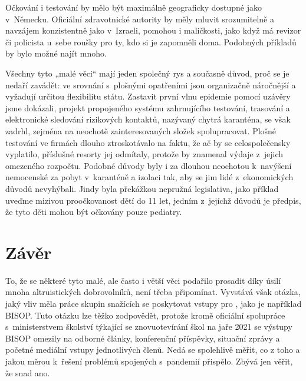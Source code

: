 Očkování i testování by mělo být maximálně geograficky dostupné jako v~Ně\-mec\-ku. Oficiální zdravotnické autority by měly mluvit srozumitelně a navzájem konzistentně jako v~Izraeli, pomohou i maličkosti, jako když má revizor či policista u~sebe roušky pro ty, kdo si je zapomněli doma. Podobných příkladů by bylo možné najít mnoho.

Všechny tyto „malé věci“ mají jeden společný rys a současně důvod, proč se je nedaří zavádět: ve srovnání s~plošnými opatřeními jsou organizačně náročnější a vyžadují určitou flexibilitu státu. Zastavit první vlnu epidemie pomocí uzávěry jsme dokázali, projekt propojeného systému zahrnujícího testování, trasování a elektronické sledování rizikových kontaktů, nazývaný chytrá karanténa, se však zadrhl, zejména na neochotě zainteresovaných složek spolupracovat. Plošné testování ve firmách dlouho ztroskotávalo na faktu, že ač by se celospolečensky vyplatilo, příslušné resorty jej odmítaly, protože by znamenal výdaje z~jejich omezeného roz\-poč\-tu. Podobné důvody byly i za dlouhou neochotou k~navýšení nemocenské za pobyt v~karanténě a izolaci tak, aby se jim lidé z~ekonomických důvodů nevyhýbali. Jindy byla překážkou nepružná legislativa, jako příklad uveďme mizivou proočkovanost dětí do 11 let, jedním z~jejíchž důvodů je předpis, že tyto děti mohou být očkovány pouze pediatry. 

\section*{Závěr}

To, že se některé tyto malé, ale často i větší věci podařilo prosadit díky úsilí mnoha altruistických dobrovolníků, není třeba připomínat. Vyvstává však otázka, jaký vliv měla práce skupin snažících se poskytovat vstupy pro , jako je například BISOP.  Tuto otázku lze těžko zodpovědět, protože kromě oficiální spolupráce s~ministerstvem školství týkající se znovuotevírání škol na jaře 2021 se výstupy BISOP omezily na odborné články, konferenční příspěvky, situační zprávy a početné mediální vstupy jednotlivých členů. Nedá se spolehlivě měřit, co z toho a jakou měrou k~řešení problémů spojených s~pandemií přispělo. Zbývá jen věřit, že snad ano.


